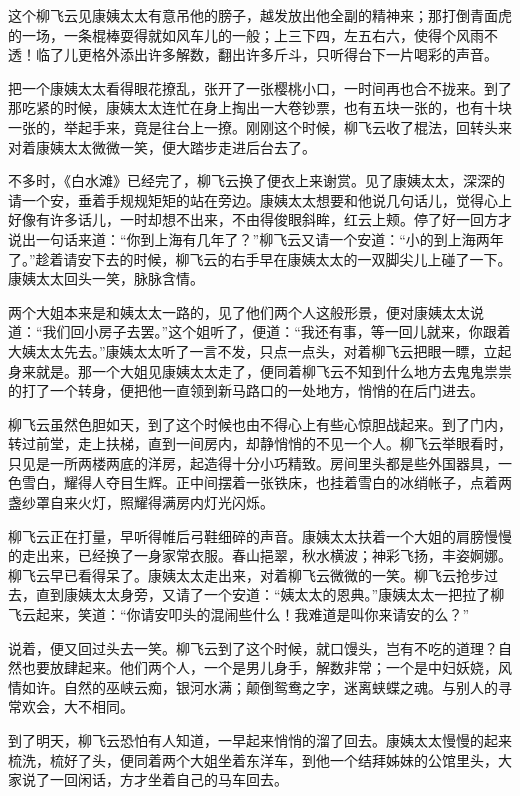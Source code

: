 \documentclass[12pt,UTF8]{ctexbook}
\begin{document}
{{{这个柳飞云见康姨太太有意吊他的膀子，越发放出他全副的精神来；那打倒青面虎的一场，一条棍棒耍得就如风车儿的一般；上三下四，左五右六，使得个风雨不透！临了儿更格外添出许多解数，翻出许多斤斗，只听得台下一片喝彩的声音。

把一个康姨太太看得眼花撩乱，张开了一张樱桃小口，一时间再也合不拢来。到了那吃紧的时候，康姨太太连忙在身上掏出一大卷钞票，也有五块一张的，也有十块一张的，举起手来，竟是往台上一撩。刚刚这个时候，柳飞云收了棍法，回转头来对着康姨太太微微一笑，便大踏步走进后台去了。

不多时，《白水滩》已经完了，柳飞云换了便衣上来谢赏。见了康姨太太，深深的请一个安，垂着手规规矩矩的站在旁边。康姨太太想要和他说几句话儿，觉得心上好像有许多话儿，一时却想不出来，不由得俊眼斜眸，红云上颊。停了好一回方才说出一句话来道：“你到上海有几年了？”柳飞云又请一个安道：“小的到上海两年了。”趁着请安下去的时候，柳飞云的右手早在康姨太太的一双脚尖儿上碰了一下。康姨太太回头一笑，脉脉含情。

两个大姐本来是和姨太太一路的，见了他们两个人这般形景，便对康姨太太说道：“我们回小房子去罢。”这个姐听了，便道：“我还有事，等一回儿就来，你跟着大姨太太先去。”康姨太太听了一言不发，只点一点头，对着柳飞云把眼一瞟，立起身来就是。那一个大姐见康姨太太走了，便同着柳飞云不知到什么地方去鬼鬼祟祟的打了一个转身，便把他一直领到新马路口的一处地方，悄悄的在后门进去。

柳飞云虽然色胆如天，到了这个时候也由不得心上有些心惊胆战起来。到了门内，转过前堂，走上扶梯，直到一间房内，却静悄悄的不见一个人。柳飞云举眼看时，只见是一所两楼两底的洋房，起造得十分小巧精致。房间里头都是些外国器具，一色雪白，耀得人夺目生辉。正中间摆着一张铁床，也挂着雪白的冰绡帐子，点着两盏纱罩自来火灯，照耀得满房内灯光闪烁。

柳飞云正在打量，早听得帷后弓鞋细碎的声音。康姨太太扶着一个大姐的肩膀慢慢的走出来，已经换了一身家常衣服。春山挹翠，秋水横波；神彩飞扬，丰姿婀娜。柳飞云早已看得呆了。康姨太太走出来，对着柳飞云微微的一笑。柳飞云抢步过去，直到康姨太太身旁，又请了一个安道：“姨太太的恩典。”康姨太太一把拉了柳飞云起来，笑道：“你请安叩头的混闹些什么！我难道是叫你来请安的么？”

说着，便又回过头去一笑。柳飞云到了这个时候，就口馒头，岂有不吃的道理？自然也要放肆起来。他们两个人，一个是男儿身手，解数非常；一个是中妇妖娆，风情如许。自然的巫峡云痴，银河水满；颠倒鸳鸯之字，迷离蛱蝶之魂。与别人的寻常欢会，大不相同。

到了明天，柳飞云恐怕有人知道，一早起来悄悄的溜了回去。康姨太太慢慢的起来梳洗，梳好了头，便同着两个大姐坐着东洋车，到他一个结拜姊妹的公馆里头，大家说了一回闲话，方才坐着自己的马车回去。

}}}
\end{document}
